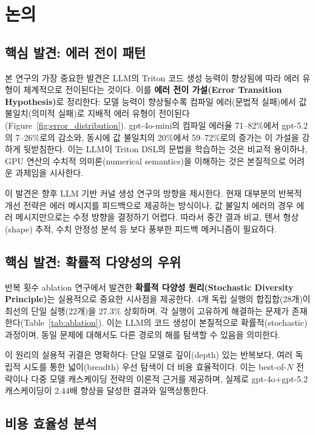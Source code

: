 \documentclass[sigplan,screen,review,anonymous]{acmart}
\begin{document}
\section{논의}
\label{sec:discussion}

\subsection{핵심 발견: 에러 전이 패턴}
\label{subsec:error_transition}

본 연구의 가장 중요한 발견은 LLM의 Triton 코드 생성 능력이 향상됨에 따라 에러 유형이 체계적으로 전이된다는 것이다. 이를 \textbf{에러 전이 가설(Error Transition Hypothesis)}로 정리한다: 모델 능력이 향상될수록 컴파일 에러(문법적 실패)에서 값 불일치(의미적 실패)로 지배적 에러 유형이 전이된다(Figure~\ref{fig:error_distribution}). gpt-4o-mini의 컴파일 에러율 71--82\%에서 gpt-5.2의 7--26\%로의 감소와, 동시에 값 불일치의 20\%에서 59--72\%로의 증가는 이 가설을 강하게 뒷받침한다. 이는 LLM이 Triton DSL의 문법을 학습하는 것은 비교적 용이하나, GPU 연산의 수치적 의미론(numerical semantics)을 이해하는 것은 본질적으로 어려운 과제임을 시사한다.

이 발견은 향후 LLM 기반 커널 생성 연구의 방향을 제시한다. 현재 대부분의 반복적 개선 전략은 에러 메시지를 피드백으로 제공하는 방식이나, 값 불일치 에러의 경우 에러 메시지만으로는 수정 방향을 결정하기 어렵다. 따라서 중간 결과 비교, 텐서 형상(shape) 추적, 수치 안정성 분석 등 보다 풍부한 피드백 메커니즘이 필요하다.

\subsection{핵심 발견: 확률적 다양성의 우위}

반복 횟수 ablation 연구에서 발견한 \textbf{확률적 다양성 원리(Stochastic Diversity Principle)}는 실용적으로 중요한 시사점을 제공한다. 4개 독립 실행의 합집합(28개)이 최선의 단일 실행(22개)을 27.3\% 상회하며, 각 실행이 고유하게 해결하는 문제가 존재한다(Table~\ref{tab:ablation}). 이는 LLM의 코드 생성이 본질적으로 확률적(stochastic) 과정이며, 동일 문제에 대해서도 다른 경로의 해를 탐색할 수 있음을 의미한다.

이 원리의 실용적 귀결은 명확하다: 단일 모델로 깊이(depth) 있는 반복보다, 여러 독립적 시도를 통한 넓이(breadth) 우선 탐색이 더 비용 효율적이다. 이는 best-of-$N$ 전략이나 다중 모델 캐스케이딩 전략의 이론적 근거를 제공하며, 실제로 gpt-4o$+$gpt-5.2 캐스케이딩이 2.44배 향상을 달성한 결과와 일맥상통한다.

\subsection{비용 효율성 분석}
\end{document}
